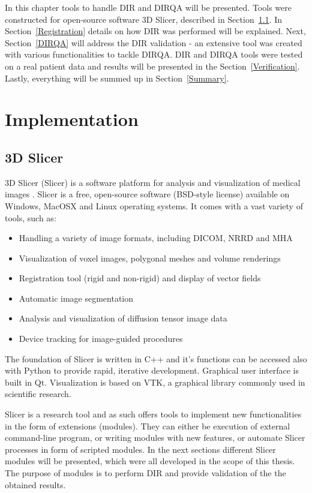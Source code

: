 \documentclass[type=dr, dr=rernat, accentcolor=tud7b,colorbacktitle, bigchapter, openright, twoside, 12pt ]{tudthesis}
\begin{document}
In this chapter tools to handle DIR and DIRQA will be presented. Tools were constructed for open-source software 3D Slicer, described in Section~\ref{Slicer}. 
In Section~\ref{Registration} details on how DIR was performed will be explained. Next, Section~\ref{DIRQA} will address the DIR validation - an extensive tool was created with various functionalities to tackle DIRQA.
DIR and DIRQA tools were tested on a real patient data and results will be presented in the Section~\ref{Verification}. Lastly, everything will be summed up in Section~\ref{Summary}.

\section{Implementation}
\label{Implementation}

\subsection{3D Slicer}
\label{Slicer}

3D Slicer (Slicer) is a software platform for analysis and visualization of medical images \cite{Slicer, Fedorov2012}. Slicer is a free, open-source software (BSD-style license) available on Windows, MacOSX and Linux operating systems. 
It comes with a vast variety of tools, such as:

\begin{itemize}
	\item Handling a variety of image formats, including DICOM, NRRD and MHA
	\item Visualization of voxel images, polygonal meshes and volume renderings
	\item Registration tool (rigid and non-rigid) and display of vector fields
	\item Automatic image segmentation
	\item Analysis and visualization of diffusion tensor image data
	\item Device tracking for image-guided procedures
\end{itemize}

The foundation of Slicer is written in C++ and it's functions can be accessed also with Python to provide rapid, iterative development. Graphical user interface is built in Qt. Visualization is based on VTK, a graphical library commonly
used in scientific research.

Slicer is a research tool and as such offers tools to implement new functionalities in the form of extensions (modules). They can either be execution of external command-line program, or writing modules with new features,
or automate Slicer processes in form of scripted modules. In the next sections different Slicer modules will be presented, which were all developed in the scope of this thesis. 
The purpose of modules is to perform DIR and provide validation of the the obtained results.
\end{document}
